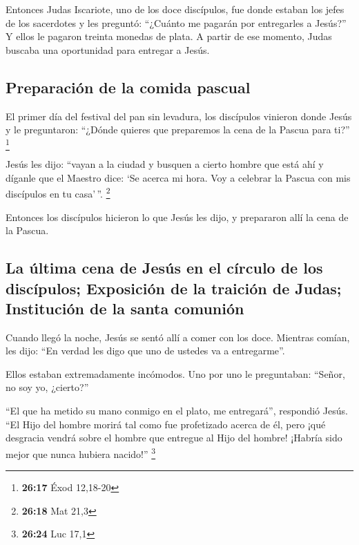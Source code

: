  Entonces Judas Iscariote, uno de los doce discípulos,
fue donde estaban los jefes de los sacerdotes  y les
preguntó: ``¿Cuánto me pagarán por entregarles a Jesús?'' Y ellos le
pagaron treinta monedas de plata.  A partir de ese
momento, Judas buscaba una oportunidad para entregar a Jesús.

\hypertarget{preparaciuxf3n-de-la-comida-pascual}{%
\subsection{Preparación de la comida
pascual}\label{preparaciuxf3n-de-la-comida-pascual}}

 El primer día del festival del pan sin levadura, los
discípulos vinieron donde Jesús y le preguntaron: ``¿Dónde quieres que
preparemos la cena de la Pascua para ti?'' \footnote{\textbf{26:17} Éxod
  12,18-20}

 Jesús les dijo: ``vayan a la ciudad y busquen a cierto
hombre que está ahí y díganle que el Maestro dice: `Se acerca mi hora.
Voy a celebrar la Pascua con mis discípulos en tu casa'\,''. \footnote{\textbf{26:18}
  Mat 21,3}

 Entonces los discípulos hicieron lo que Jesús les dijo,
y prepararon allí la cena de la Pascua.

\hypertarget{la-uxfaltima-cena-de-jesuxfas-en-el-cuxedrculo-de-los-discuxedpulos-exposiciuxf3n-de-la-traiciuxf3n-de-judas-instituciuxf3n-de-la-santa-comuniuxf3n}{%
\subsection{La última cena de Jesús en el círculo de los discípulos;
Exposición de la traición de Judas; Institución de la santa
comunión}\label{la-uxfaltima-cena-de-jesuxfas-en-el-cuxedrculo-de-los-discuxedpulos-exposiciuxf3n-de-la-traiciuxf3n-de-judas-instituciuxf3n-de-la-santa-comuniuxf3n}}

 Cuando llegó la noche, Jesús se sentó allí a comer con
los doce.  Mientras comían, les dijo: ``En verdad les
digo que uno de ustedes va a entregarme''.

 Ellos estaban extremadamente incómodos. Uno por uno le
preguntaban: ``Señor, no soy yo, ¿cierto?''

 ``El que ha metido su mano conmigo en el plato, me
entregará'', respondió Jesús.  ``El Hijo del hombre
morirá tal como fue profetizado acerca de él, pero ¡qué desgracia vendrá
sobre el hombre que entregue al Hijo del hombre! ¡Habría sido mejor que
nunca hubiera nacido!'' \footnote{\textbf{26:24} Luc 17,1}

